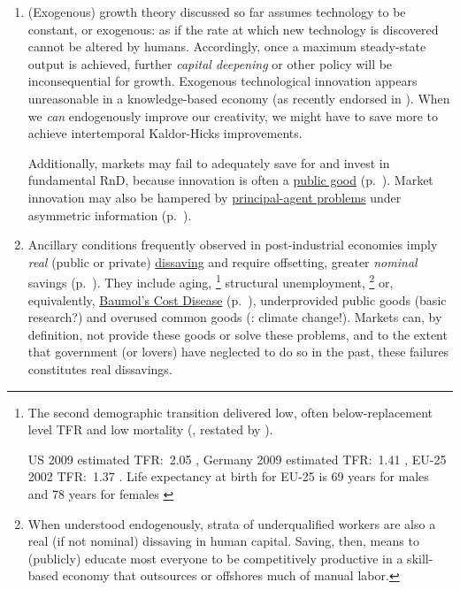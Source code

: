 \begin{enumerate}%
	\item (Exogenous) growth theory discussed so far assumes technology to be constant, or exogenous:
as if the rate at which new technology is discovered cannot be altered by humans.
Accordingly, once a maximum steady-state output is achieved, further \emph{capital deepening} or other policy will be inconsequential for growth.
Exogenous technological innovation appears unreasonable in a knowledge-based economy (as recently endorsed in \citealt{Communities2009}).
When we \emph{can} endogenously improve our creativity, we might have to save more to achieve intertemporal Kaldor-Hicks improvements.

	Additionally, markets may fail to adequately save for and invest in fundamental \gls{RnD}, because innovation is often a \hyperref[sec:public-good]{public good} (p.~\pageref{sec:public-good}).
Market innovation may also be hampered by \hyperref[sec:principal-agent-problem]{principal-agent problems} under asymmetric information (p.~\pageref{sec:principal-agent-problem}).

	\item Ancillary conditions frequently observed in post-industrial economies imply \emph{real} (public or private) \hyperref[sec:delta-net-worth]{dissaving} and require offsetting, greater \emph{nominal} savings (p.~\pageref{sec:delta-net-worth}).
	They include aging,
	\footnote{
		The second demographic transition delivered low, often below-replacement level \gls{TFR} and low mortality (\citealt{Davis1945}, restated by \citealt{Caldwell-1976-aa}).

		US 2009 estimated \gls{TFR}:~2.05 \citep{CIA2009}, Germany 2009 estimated \gls{TFR}:~1.41 \citep{CIA2009}, EU-25 2002 \gls{TFR}:~1.37 \citep[2]{Demeny-2003-aa}.
		Life expectancy at birth for EU-25 is 69 years for males and 78 years for females \citep[2]{Demeny-2003-aa}
	}
	structural unemployment,
	\footnote{
		When understood endogenously, strata of underqualified workers are also a real (if not nominal) dissaving in human capital.
		Saving, then, means to (publicly) educate most everyone to be competitively productive in a skill-based economy that outsources or offshores much of manual labor.
	}
	or, equivalently, \hyperref[itm:non-linear-returns]{Baumol's Cost Disease} (p.~\pageref{itm:non-linear-returns}), underprovided public goods (basic research?) and overused common goods (\citealt{Stern-2006-aa}:
climate change!).
Markets can, by definition, not provide these goods or solve these problems, and to the extent that government (or lovers) have neglected to do so in the past, these failures constitutes real dissavings.


\end{enumerate}
